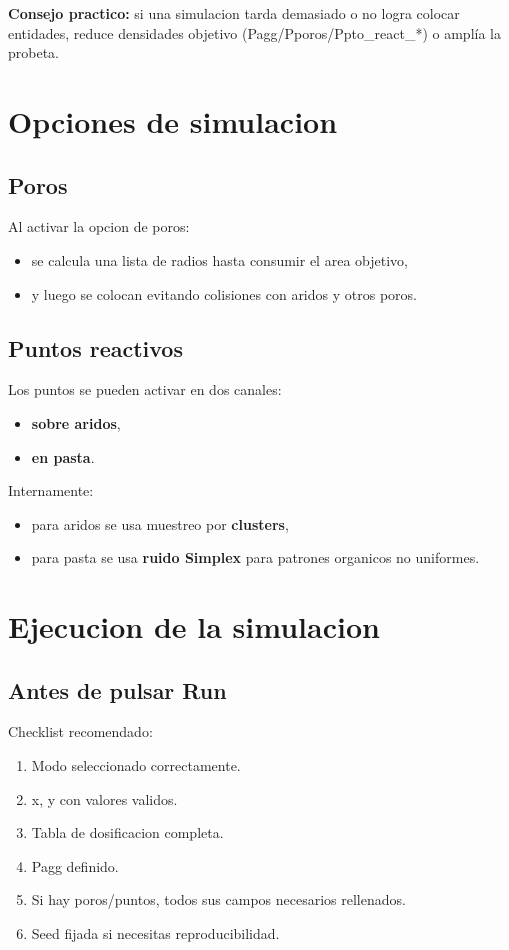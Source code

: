 \documentclass[11pt,a4paper]{article}
\begin{document}
\textbf{Consejo practico:}
si una simulacion tarda demasiado o no logra colocar entidades, reduce densidades objetivo (Pagg/Pporos/Ppto\_react\_*) o amplía la probeta.

\section{Opciones de simulacion}
\subsection{Poros}
Al activar la opcion de poros:
\begin{itemize}[leftmargin=1.5em]
  \item se calcula una lista de radios hasta consumir el area objetivo,
  \item y luego se colocan evitando colisiones con aridos y otros poros.
\end{itemize}

\subsection{Puntos reactivos}
Los puntos se pueden activar en dos canales:
\begin{itemize}[leftmargin=1.5em]
  \item \textbf{sobre aridos},
  \item \textbf{en pasta}.
\end{itemize}

Internamente:
\begin{itemize}[leftmargin=1.5em]
  \item para aridos se usa muestreo por \textbf{clusters},
  \item para pasta se usa \textbf{ruido Simplex} para patrones organicos no uniformes.
\end{itemize}

\section{Ejecucion de la simulacion}
\subsection{Antes de pulsar Run}
Checklist recomendado:
\begin{enumerate}[leftmargin=1.7em]
  \item Modo seleccionado correctamente.
  \item x, y con valores validos.
  \item Tabla de dosificacion completa.
  \item Pagg definido.
  \item Si hay poros/puntos, todos sus campos necesarios rellenados.
  \item Seed fijada si necesitas reproducibilidad.
\end{enumerate}
\end{document}
